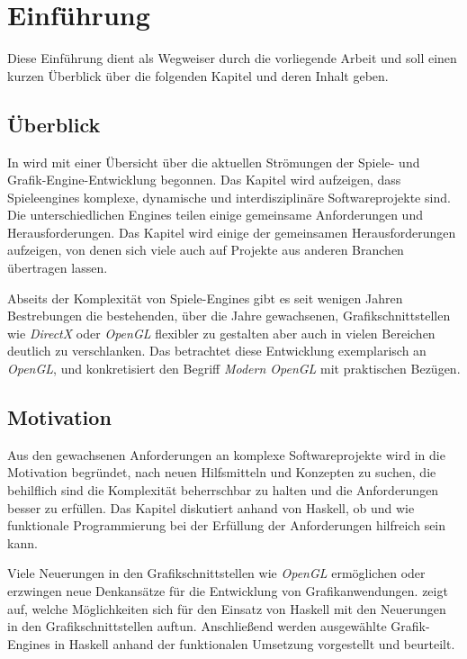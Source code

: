 \chapter{Einführung}

Diese Einführung dient als Wegweiser durch die vorliegende Arbeit und soll einen kurzen Überblick über die folgenden Kapitel und deren Inhalt geben.

\section{Überblick}

In  wird mit einer Übersicht über die aktuellen Strömungen der Spiele- und Grafik-Engine-Entwicklung begonnen. Das Kapitel wird aufzeigen, dass Spieleengines komplexe, dynamische und interdisziplinäre Softwareprojekte sind. Die unterschiedlichen Engines teilen einige gemeinsame Anforderungen und Herausforderungen. Das Kapitel wird einige der gemeinsamen Herausforderungen aufzeigen, von denen sich viele auch auf Projekte aus anderen Branchen übertragen lassen.

Abseits der Komplexität von Spiele-Engines gibt es seit wenigen Jahren Bestrebungen die bestehenden, über die Jahre gewachsenen, Grafikschnittstellen wie \textit{DirectX} oder \textit{OpenGL} flexibler zu gestalten aber auch in vielen Bereichen deutlich zu verschlanken. Das  betrachtet diese Entwicklung exemplarisch an \textit{OpenGL}, und konkretisiert den Begriff \textit{Modern OpenGL} mit praktischen Bezügen.

\section{Motivation}

Aus den gewachsenen Anforderungen an komplexe Softwareprojekte wird in  die Motivation begründet, nach neuen Hilfsmitteln und Konzepten zu suchen, die behilflich sind die Komplexität beherrschbar zu halten und die Anforderungen besser zu erfüllen. Das Kapitel diskutiert anhand von Haskell, ob und wie funktionale Programmierung bei der Erfüllung der Anforderungen hilfreich sein kann.

Viele Neuerungen in den Grafikschnittstellen wie \textit{OpenGL} ermöglichen oder erzwingen neue Denkansätze für die Entwicklung von Grafikanwendungen.  zeigt auf, welche Möglichkeiten sich für den Einsatz von Haskell mit den Neuerungen in den Grafikschnittstellen auftun. Anschließend werden ausgewählte Grafik-Engines in Haskell anhand der funktionalen Umsetzung vorgestellt und beurteilt.

